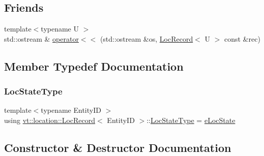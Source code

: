 \subsection*{Friends}
\begin{DoxyCompactItemize}
\item 
{\footnotesize template$<$typename U $>$ }\\std\+::ostream \& \hyperlink{structvt_1_1location_1_1_loc_record_ac94f95ab9e7fa58002314e99696972d7}{operator$<$$<$} (std\+::ostream \&os, \hyperlink{structvt_1_1location_1_1_loc_record}{Loc\+Record}$<$ U $>$ const \&rec)
\end{DoxyCompactItemize}


\subsection{Member Typedef Documentation}
\mbox{\label{structvt_1_1location_1_1_loc_record_a292a4bfaf13edb8d1c2e7a4fdd5421fb}} 
\subsubsection{\texorpdfstring{Loc\+State\+Type}{LocStateType}}
{\footnotesize\ttfamily template$<$typename Entity\+ID $>$ \\
using \hyperlink{structvt_1_1location_1_1_loc_record}{vt\+::location\+::\+Loc\+Record}$<$ Entity\+ID $>$\+::\hyperlink{namespacevt_1_1location_a7a5c74aad68cf57281515029d8521547}{Loc\+State\+Type} =  \hyperlink{namespacevt_1_1location_a7a5c74aad68cf57281515029d8521547}{e\+Loc\+State}}



\subsection{Constructor \& Destructor Documentation}
\mbox{\label{structvt_1_1location_1_1_loc_record_ade33ca9b748edfc1cacdf1738700ef5b}} 
